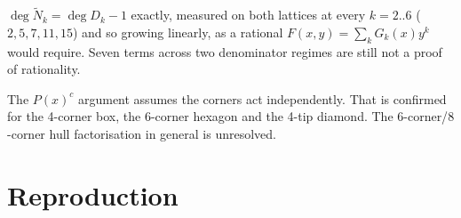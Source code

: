 \documentclass[11pt]{article}
\begin{document}
\begin{openproblem}
$\deg\widetilde N_k = \deg D_k - 1$ exactly, measured on both lattices at
every $k = 2..6$ ($2, 5, 7, 11, 15$) and so growing linearly, as a
rational $F(x,y) = \sum_k G_k(x)y^k$ would require. Seven terms across two
denominator regimes are still not a proof of rationality.
\end{openproblem}

\begin{openproblem}
The $P(x)^c$ argument assumes the corners act independently. That is confirmed
for the 4-corner box, the 6-corner hexagon and the 4-tip diamond. The
$6$-corner/$8$-corner hull factorisation in general is unresolved.
\end{openproblem}

\section{Reproduction}
\label{sec:repro}
\end{document}

